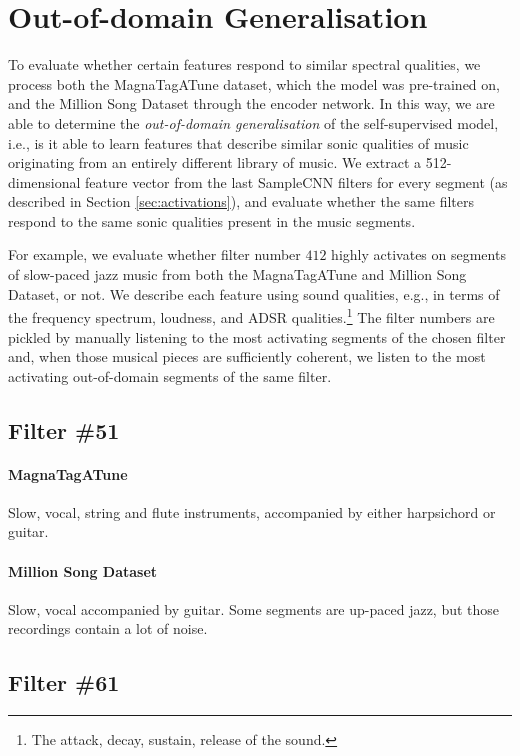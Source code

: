 \section{Out-of-domain Generalisation}\label{sec:manual_interpretations}
To evaluate whether certain features respond to similar spectral qualities, we process both the MagnaTagATune dataset, which the model was pre-trained on, and the Million Song Dataset through the encoder network. In this way, we are able to determine the \textit{out-of-domain generalisation} of the self-supervised model, i.e., is it able to learn features that describe similar sonic qualities of music originating from an entirely different library of music. We extract a 512-dimensional feature vector from the last SampleCNN filters for every segment (as described in Section \ref{sec:activations}), and evaluate whether the same filters respond to the same sonic qualities present in the music segments.

For example, we evaluate whether filter number $412$ highly activates on segments of slow-paced jazz music from both the MagnaTagATune and Million Song Dataset, or not. We describe each feature using sound qualities, e.g., in terms of the frequency spectrum, loudness, and ADSR qualities.\footnote{The attack, decay, sustain, release of the sound.} The filter numbers are pickled by manually listening to the most activating segments of the chosen filter and, when those musical pieces are sufficiently coherent, we listen to the most activating out-of-domain segments of the same filter.

\subsection*{Filter \#51}
\paragraph{MagnaTagATune}
Slow, vocal, string and flute instruments, accompanied by either harpsichord or guitar.
\paragraph{Million Song Dataset}
Slow, vocal accompanied by guitar. Some segments are up-paced jazz, but those recordings contain a lot of noise.

\subsection*{Filter \#61}
